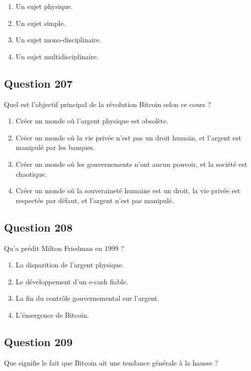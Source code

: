 \documentclass[12pt,a4paper]{article}
\begin{document}
\begin{enumerate}[label=\Alph*., leftmargin=*]
\item Un sujet physique.
\item Un sujet simple.
\item Un sujet mono-disciplinaire.
\item Un sujet multidisciplinaire.
\end{enumerate}

\bigskip


\subsection*{Question 207}
Quel est l'objectif principal de la révolution Bitcoin selon ce cours ?

\begin{enumerate}[label=\Alph*., leftmargin=*]
\item Créer un monde où l'argent physique est obsolète.
\item Créer un monde où la vie privée n'est pas un droit humain, et l'argent est manipulé par les banques.
\item Créer un monde où les gouvernements n'ont aucun pouvoir, et la société est chaotique.
\item Créer un monde où la souveraineté humaine est un droit, la vie privée est respectée par défaut, et l'argent n'est pas manipulé.
\end{enumerate}

\bigskip


\subsection*{Question 208}
Qu'a prédit Milton Friedman en 1999 ?

\begin{enumerate}[label=\Alph*., leftmargin=*]
\item La disparition de l'argent physique.
\item Le développement d'un e-cash fiable.
\item La fin du contrôle gouvernemental sur l'argent.
\item L'émergence de Bitcoin.
\end{enumerate}

\bigskip


\subsection*{Question 209}
Que signifie le fait que Bitcoin ait une tendance générale à la hausse ?
\end{document}
